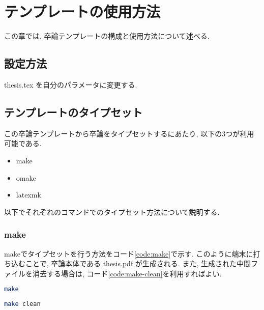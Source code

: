 \chapter{テンプレートの使用方法}

この章では, 卒論テンプレートの構成と使用方法について述べる.

\section{設定方法}
thesis.tex を自分のパラメータに変更する.

\section{テンプレートのタイプセット}
この卒論テンプレートから卒論をタイプセットするにあたり, 以下の3つが利用可能である.
\begin{itemize}
\item make
\item omake
\item latexmk
\end{itemize}
以下でそれぞれのコマンドでのタイプセット方法について説明する.

\subsection{make}

makeでタイプセットを行う方法をコード\ref{code:make}で示す.
このように端末に打ち込むことで, 卒論本体である thesis.pdf が生成される.
また, 生成された中間ファイルを消去する場合は, コード\ref{code:make-clean}を利用すればよい.

\begin{minipage}{\textwidth}
\begin{lstlisting}[caption={makeコマンド}, label={code:make}, language={sh}]
make
\end{lstlisting}

\begin{lstlisting}[caption={中間ファイルの除去}, label={code:make-clean}, language={sh}]
make clean
\end{lstlisting}


\end{minipage}

